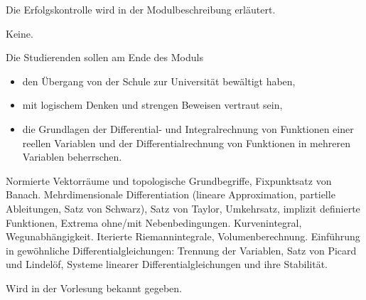 \begin{course}

\setdoclanguagegerman
{}



\coursehead


\label{cour_7029.dp_997}


\begin{styleenv}
\begin{assessment}
Die Erfolgskontrolle wird in der Modulbeschreibung erläutert.


\end{assessment}

\begin{conditions}Keine.\end{conditions}


\end{styleenv}

\begin{learningoutcomes}
Die Studierenden sollen am Ende des Moduls

 \begin{itemize}\item den Übergang von der Schule zur Universität bewältigt haben,  \item mit logischem Denken und strengen Beweisen vertraut sein,  \item die Grundlagen der Differential- und Integralrechnung von Funktionen einer reellen Variablen und der Differentialrechnung von Funktionen in mehreren Variablen beherrschen.  \end{itemize}
\end{learningoutcomes}

\begin{content}
Normierte Vektorräume und topologische Grundbegriffe, Fixpunktsatz von Banach. Mehrdimensionale Differentiation (lineare Approximation, partielle Ableitungen, Satz von Schwarz), Satz von Taylor, Umkehrsatz, implizit definierte Funktionen, Extrema ohne/mit Nebenbedingungen. Kurvenintegral, Wegunabhängigkeit. Iterierte Riemannintegrale, Volumenberechnung. Einführung in gewöhnliche Differentialgleichungen: Trennung der Variablen, Satz von Picard und Lindelöf, Systeme linearer Differentialgleichungen und ihre Stabilität.


\end{content}



\begin{literature}Wird in der Vorlesung bekannt gegeben.

\end{literature}



\end{course}